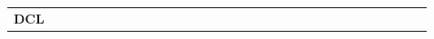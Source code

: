 \documentclass[10pt,twocolumn,letterpaper]{article}
\begin{document}
\begin{table}
\begin{center}
\begin{tabular}{|c|c|c|c|c|c|c|c|c|c|c|c|c|c|c|c|c|c|c|c|c|c|c|c|c|||c|c|c|c|c|c|c|c|||}
\\
\hline
\multicolumn{4}{|c|}{\textbf{DCL}~\cite{LiYu16}}

\end{tabular}
\end{center}
\end{table}
\end{document}
